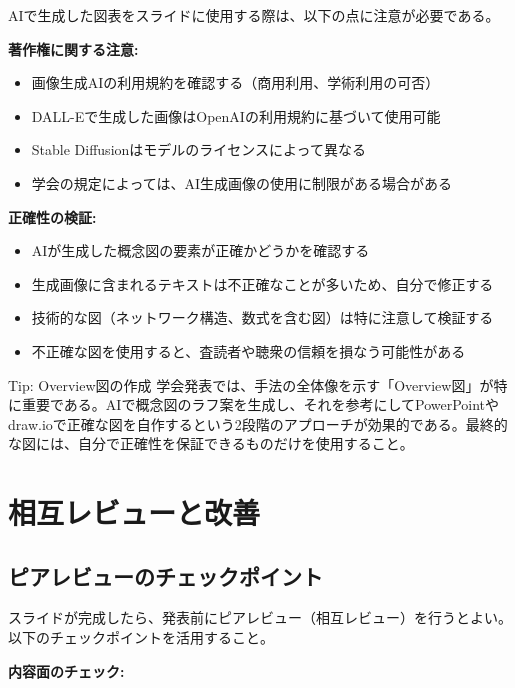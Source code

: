 AIで生成した図表をスライドに使用する際は、以下の点に注意が必要である。

\textbf{著作権に関する注意:}

\begin{itemize}
\item 画像生成AIの利用規約を確認する（商用利用、学術利用の可否）
\item DALL-Eで生成した画像はOpenAIの利用規約に基づいて使用可能
\item Stable Diffusionはモデルのライセンスによって異なる
\item 学会の規定によっては、AI生成画像の使用に制限がある場合がある
\end{itemize}

\textbf{正確性の検証:}

\begin{itemize}
\item AIが生成した概念図の要素が正確かどうかを確認する
\item 生成画像に含まれるテキストは不正確なことが多いため、自分で修正する
\item 技術的な図（ネットワーク構造、数式を含む図）は特に注意して検証する
\item 不正確な図を使用すると、査読者や聴衆の信頼を損なう可能性がある
\end{itemize}

\begin{itembox}[l]{Tip: Overview図の作成}
学会発表では、手法の全体像を示す「Overview図」が特に重要である。AIで概念図のラフ案を生成し、それを参考にしてPowerPointやdraw.ioで正確な図を自作するという2段階のアプローチが効果的である。最終的な図には、自分で正確性を保証できるものだけを使用すること。
\end{itembox}

\section{相互レビューと改善}
\label{sec:5.6}

\subsection{ピアレビューのチェックポイント}

スライドが完成したら、発表前にピアレビュー（相互レビュー）を行うとよい。以下のチェックポイントを活用すること。

\textbf{内容面のチェック:}

